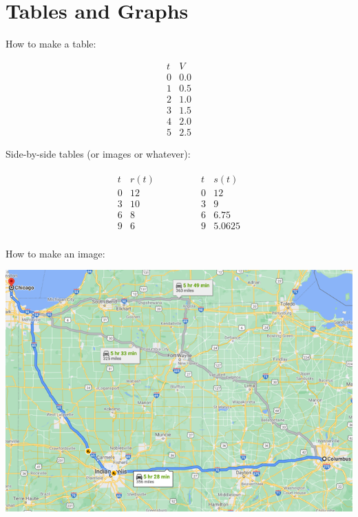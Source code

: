 \documentclass[nooutcomes]{ximera}
\begin{document}

\section{Tables and Graphs}

How to make a table:


$$
\begin{array}{cc}
t&V\\
\hline
0&0.0\\
1&0.5\\
2&1.0\\
3&1.5\\
4&2.0\\
5&2.5
\end{array}
$$


Side-by-side tables (or images or whatever):


$$
\begin{array}{cccccc}
{\begin{array}{cc}
t&r(t)\\
\hline
0&12\\
3&10\\
6&8\\
9&6
\end{array}}&&&&&
{\begin{array}{cc}
t&s(t)\\
\hline
0&12\\
3&9\\
6&6.75\\
9&5.0625
\end{array}}\\
\end{array}
$$


How to make an image:
\begin{image}
\includegraphics{ColumbusChicago.png}
\end{image}
\end{document}
